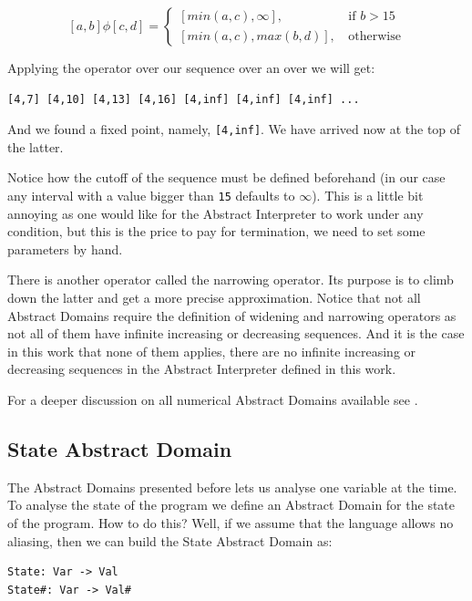 \documentclass[
11pt, %
english, %
singlespacing, %
headsepline, %
]{MastersDoctoralThesis} %
\begin{document}
\[[a, b] \phi [c, d] =
     \begin{cases}
       [min(a,c), \infty]\text{, } & \text{if } b > 15 \\
       [min(a,c), max(b,d)]\text{, } & \text{otherwise}
     \end{cases}\]

Applying the operator over our sequence over an over we will get:

\begin{verbatim}
[4,7] [4,10] [4,13] [4,16] [4,inf] [4,inf] [4,inf] ...
\end{verbatim}

And we found a fixed point, namely, \texttt{{[}4,inf{]}}. We have
arrived now at the top of the latter.

Notice how the cutoff of the sequence must be defined beforehand (in our
case any interval with a value bigger than \texttt{15} defaults to
\(\infty{}\)). This is a little bit annoying as one would like for the
Abstract Interpreter to work under any condition, but this is the price
to pay for termination, we need to set some parameters by hand.

There is another operator called the narrowing operator. Its purpose is
to climb down the latter and get a more precise approximation. Notice
that not all Abstract Domains require the definition of widening and
narrowing operators as not all of them have infinite increasing or
decreasing sequences. And it is the case in this work that none of them
applies, there are no infinite increasing or decreasing sequences in the
Abstract Interpreter defined in this work.

For a deeper discussion on all numerical Abstract Domains available see
\textcite{mine_weakly_2004}.

\hypertarget{state-abstract-domain}{%
\subsection{State Abstract Domain}\label{state-abstract-domain}}

The Abstract Domains presented before lets us analyse one variable at
the time. To analyse the state of the program we define an Abstract
Domain for the state of the program. How to do this? Well, if we assume
that the language allows no aliasing, then we can build the State
Abstract Domain as:

\begin{verbatim}
State: Var -> Val
State#: Var -> Val#
\end{verbatim}
\end{document}
